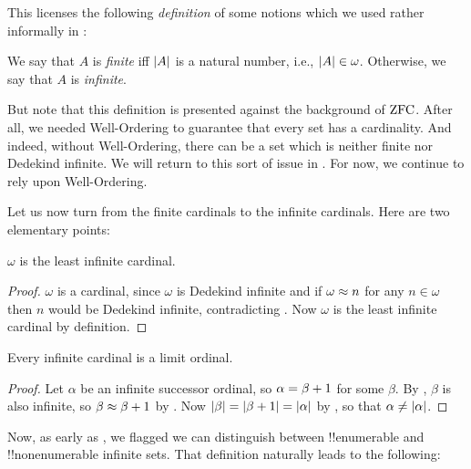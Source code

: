 \documentclass[../../../include/open-logic-section]{subfiles}
\begin{document}
This licenses the following \emph{definition} of some notions which we
used rather informally in :

\begin{defn}
We say that $A$ is \emph{finite} iff $\left| A \right|$ is a natural number,
i.e., $\left| A \right| \in \omega$. Otherwise, we say that $A$ is
\emph{infinite}.
\end{defn}

But note that this definition is presented against the background of
$\mathrm{ZFC}$. After all, we needed Well-Ordering to guarantee that every set
has a cardinality. And indeed, without Well-Ordering, there can be a
set which is neither finite nor Dedekind infinite. We will return to
this sort of issue in . For now, we continue to
rely upon Well-Ordering.

Let us now turn from the finite cardinals to the infinite cardinals.
Here are two elementary points:

\begin{cor}
$\omega$ is the least infinite cardinal. 
\end{cor}

\begin{proof}
$\omega$ is a cardinal, since $\omega$ is Dedekind infinite and if
$\omega \approx n$ for any $n \in \omega$ then $n$ would be Dedekind
infinite, contradicting
. Now
$\omega$ is the least infinite cardinal by definition. 
\end{proof}

\begin{cor}
Every infinite cardinal is a limit ordinal.
\end{cor}

\begin{proof}
Let $\alpha$ be an infinite successor ordinal, so $\alpha = \beta
+ 1$ for some $\beta$. By , $\beta$
is also infinite, so $\beta \approx \beta + 1$ by
. Now
$\left| \beta \right| = \left| \beta+ 1 \right| = \left| \alpha \right|$ by
, so
that $\alpha \neq \left| \alpha \right|$.
\end{proof}

Now, as early as , we flagged we
can distinguish between !!{enumerable} and !!{nonenumerable} infinite
sets. That definition naturally leads to the following:
\end{document}
